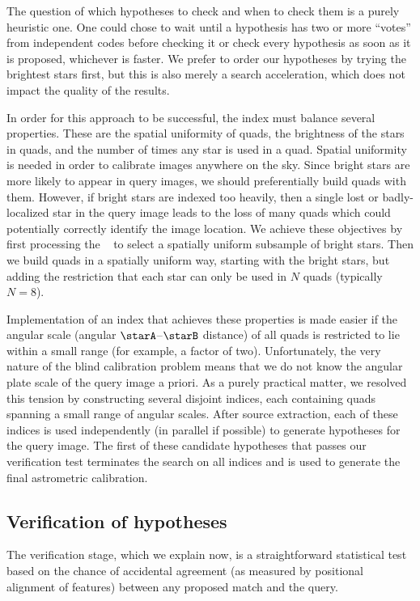 \documentclass[12pt,preprint]{aastex}
\renewcommand{\%}{\percent}
\begin{document}
The question of which hypotheses to check and when to check them is
a purely heuristic one. One could chose to wait until a hypothesis
has two or more ``votes'' from independent codes before checking it
or check every hypothesis as soon as it is proposed, whichever is
faster.  We prefer to order our hypotheses by trying the brightest
stars first, but this is also merely a search acceleration, which
does not impact the quality of the results.

In order for this approach to be successful, the index must balance
several properties.  These are the spatial uniformity of quads, the
brightness of the stars in quads, and the number of times any star is
used in a quad. Spatial uniformity is needed in order to calibrate
images anywhere on the sky. Since bright stars are more likely to
appear in query images, we should preferentially build quads with
them.  However, if bright stars are indexed too heavily, then a single
lost or badly-localized star in the query image leads to the loss of
many quads which could potentially correctly identify the image
location.  We achieve these objectives by first processing the
\USNOB\ \citep{usnob, barron} to select a spatially uniform subsample
of bright stars.  Then we build quads in a spatially uniform way,
starting with the bright stars, but adding the restriction that each
star can only be used in $N$ quads (typically $N=8$).

Implementation of an index that achieves these properties is made
easier if the angular scale (angular $\starA$--$\starB$ distance)
of all quads is
restricted to lie within a small range (for example, a factor of
two). Unfortunately, the very nature of the blind calibration problem
means that we do not know the angular plate scale of the query image a
priori. As a purely practical matter, we resolved this tension by
constructing several disjoint indices, each containing quads spanning
a small range of angular scales. After source extraction, each of
these indices is used independently (in parallel if possible) to
generate hypotheses for the query image. The first of these candidate
hypotheses that passes our verification test terminates the search on all
indices and is used to generate the final astrometric
calibration.  

\subsection{Verification of hypotheses}

The verification stage, which we explain now, is a straightforward
statistical test based on the chance of accidental agreement (as
measured by positional alignment of features) between any proposed
match and the query.
\end{document}
